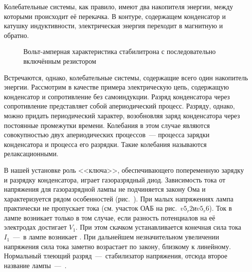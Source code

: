 


Колебательные системы, как правило, имеют два накопителя энергии, между которыми происходит её перекачка. В контуре,
содержащем конденсатор и катушку индуктивности, электрическая энергия переходит в магнитную и обратно.

\begin{figure}[h!]
	\caption{Вольт-амперная характеристика стабилитрона с последовательно включённым резистором}
\end{figure}

Встречаются, однако, колебательные системы, содержащие всего один накопитель энергии. Рассмотрим в качестве примера
электрическую цепь, содержащую конденсатор и сопротивление без самоиндукции. Разряд конденсатора через сопротивление
представляет собой апериодический процесс. Разряду, однако, можно придать периодический характер, возобновляя заряд
конденсатора через постоянные промежутки времени. Колебания в этом случае являются совокупностью двух апериодических
процессов~--- процесса зарядки конденсатора и процесса его разрядки. Такие колебания называются релаксационными.

В нашей установке роль <<ключа>>, обеспечивающего попеременную зарядку и разрядку конденсатора, играет газоразрядный
диод. Зависимость тока от напряжения для газоразрядной лампы не подчиняется закону Ома и характеризуется рядом
особенностей (рис.~). При малых напряжениях лампа практически не пропускает тока (см. участок ОАБ на рис.~$v5_r2 и v5_r6$). 
Ток в лампе возникает только в том случае, если разность потенциалов на её электродах достигает
 $V_1$. При этом скачком устанавливается конечная сила тока $I_1$~---~в лампе возникает
. При дальнейшем незначительном увеличении напряжения сила тока заметно возрастает по
закону, близкому к линейному. Нормальный тлеющий разряд~---~стабилизатор напряжения, отсюда второе название лампы~---~.

